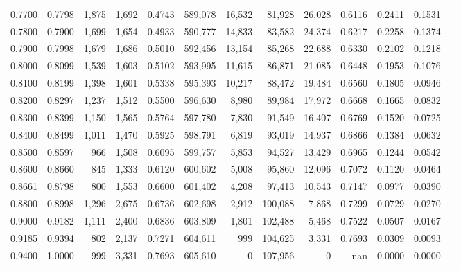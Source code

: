 \begin{tabular}{rrrrrrrrrrrrr}
0.7700 & 0.7798 &  1,875 & 1,692 &                                     0.4743 & 589,078 &  16,532 &  81,928 &  26,028 & 0.6116 & 0.2411 & 0.1531 \\
0.7800 & 0.7900 &  1,699 & 1,654 &                                     0.4933 & 590,777 &  14,833 &  83,582 &  24,374 & 0.6217 & 0.2258 & 0.1374 \\
0.7900 & 0.7998 &  1,679 & 1,686 &                                     0.5010 & 592,456 &  13,154 &  85,268 &  22,688 & 0.6330 & 0.2102 & 0.1218 \\
0.8000 & 0.8099 &  1,539 & 1,603 &                                     0.5102 & 593,995 &  11,615 &  86,871 &  21,085 & 0.6448 & 0.1953 & 0.1076 \\
0.8100 & 0.8199 &  1,398 & 1,601 &                                     0.5338 & 595,393 &  10,217 &  88,472 &  19,484 & 0.6560 & 0.1805 & 0.0946 \\
0.8200 & 0.8297 &  1,237 & 1,512 &                                     0.5500 & 596,630 &   8,980 &  89,984 &  17,972 & 0.6668 & 0.1665 & 0.0832 \\
0.8300 & 0.8399 &  1,150 & 1,565 &                                     0.5764 & 597,780 &   7,830 &  91,549 &  16,407 & 0.6769 & 0.1520 & 0.0725 \\
0.8400 & 0.8499 &  1,011 & 1,470 &                                     0.5925 & 598,791 &   6,819 &  93,019 &  14,937 & 0.6866 & 0.1384 & 0.0632 \\
0.8500 & 0.8597 &    966 & 1,508 &                                     0.6095 & 599,757 &   5,853 &  94,527 &  13,429 & 0.6965 & 0.1244 & 0.0542 \\
0.8600 & 0.8660 &    845 & 1,333 &                                     0.6120 & 600,602 &   5,008 &  95,860 &  12,096 & 0.7072 & 0.1120 & 0.0464 \\
0.8661 & 0.8798 &    800 & 1,553 &                                     0.6600 & 601,402 &   4,208 &  97,413 &  10,543 & 0.7147 & 0.0977 & 0.0390 \\
0.8800 & 0.8998 &  1,296 & 2,675 &                                     0.6736 & 602,698 &   2,912 & 100,088 &   7,868 & 0.7299 & 0.0729 & 0.0270 \\
0.9000 & 0.9182 &  1,111 & 2,400 &                                     0.6836 & 603,809 &   1,801 & 102,488 &   5,468 & 0.7522 & 0.0507 & 0.0167 \\
0.9185 & 0.9394 &    802 & 2,137 &                                     0.7271 & 604,611 &     999 & 104,625 &   3,331 & 0.7693 & 0.0309 & 0.0093 \\
0.9400 & 1.0000 &    999 & 3,331 &                                     0.7693 & 605,610 &       0 & 107,956 &       0 &    nan & 0.0000 & 0.0000 \\
\bottomrule
\end{tabular}
